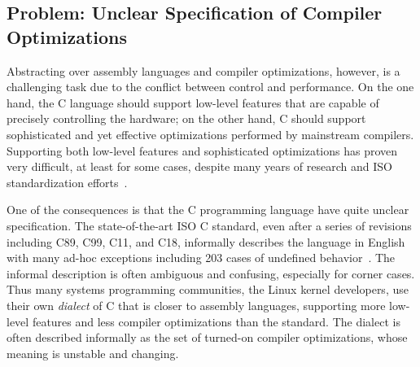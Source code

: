 



\subsection{Problem: Unclear Specification of Compiler Optimizations}
\label{sec:introduction:problem}

Abstracting over assembly languages and compiler optimizations, however, is a challenging task due
to the conflict between control and performance.  On the one hand, the C language should support
low-level features that are capable of precisely controlling the hardware; on the other hand, C
should support sophisticated and yet effective optimizations performed by mainstream compilers.
Supporting both low-level features and sophisticated optimizations has proven very difficult, at
least for some cases, despite many years of research and ISO standardization efforts~\cite{c18}.

One of the consequences is that the C programming language have quite unclear specification.  The
state-of-the-art ISO C standard, even after a series of revisions including C89, C99, C11, and C18,
informally describes the language in English with many ad-hoc exceptions including 203 cases of
undefined behavior~\cite[J.2]{c18}.  The informal description is often ambiguous and confusing,
especially for corner cases.  Thus many systems programming communities, \eg{} the Linux kernel
developers, use their own \emph{dialect} of C that is closer to assembly languages, supporting more
low-level features and less compiler optimizations than the standard.  The dialect is often
described informally as the set of turned-on compiler optimizations, whose meaning is unstable and
changing.

